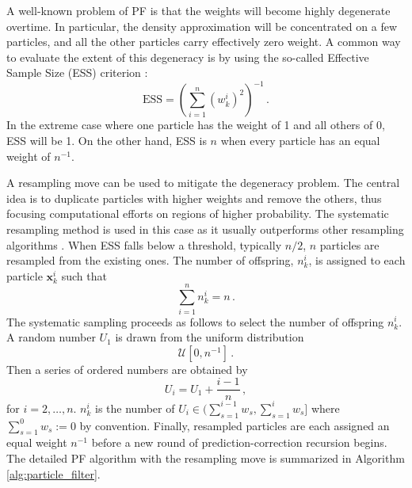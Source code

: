 A well-known problem of PF is that the weights will become highly degenerate overtime. In particular, the density approximation will be concentrated on a few particles, and all the other particles carry effectively zero weight. A common way to evaluate the extent of this degeneracy is by using the so-called Effective Sample Size (ESS) criterion \cite{liu2008monte}:
\begin{equation}
\text{ESS}=\left(\sum_{i=1}^{n}\left(w_k^{i}\right)^{2}\right)^{-1} \,.
\end{equation}
In the extreme case where one particle has the weight of 1 and all others of 0, ESS will be 1. On the other hand, ESS is $n$ when every particle has an equal weight of $n^{-1}$.

A resampling move can be used to mitigate the degeneracy problem. The central idea is to duplicate particles with higher weights and remove the others, thus focusing computational efforts on regions of higher probability. The systematic resampling method is used in this case as it usually outperforms other resampling algorithms \cite{doucet2009tutorial}. When ESS falls below a threshold, typically $n/2$, $n$ particles are resampled from the existing ones. The number of offspring, $n_k^{i}$, is assigned to each particle $\boldsymbol{x}_k^i$ such that 
$$
\sum_{i=1}^{n}n_k^{i} = n \,.
$$
The systematic sampling proceeds as follows to select the number of offspring $n_k^{i}$. A random number $U_{1}$ is drawn from the uniform distribution 
$$
\mathcal{U}\left[0, {n}^{-1}\right] \,.
$$
Then a series of ordered numbers are obtained by 
$$
U_{i}=U_{1}+\frac{i-1}{n} \,,
$$
for $i=2, \ldots, n$. $n_k^{i}$ is the number of $U_{i} \in(\sum_{s=1}^{i-1} w_{s}, \sum_{s=1}^{i} w_{s}]$ where $\sum_{s=1}^{0} w_{s} := 0$ by convention. Finally, resampled particles are each assigned an equal weight $n^{-1}$ before a new round of prediction-correction recursion begins. The detailed PF algorithm with the resampling move is summarized in Algorithm \ref{alg:particle_filter}.
